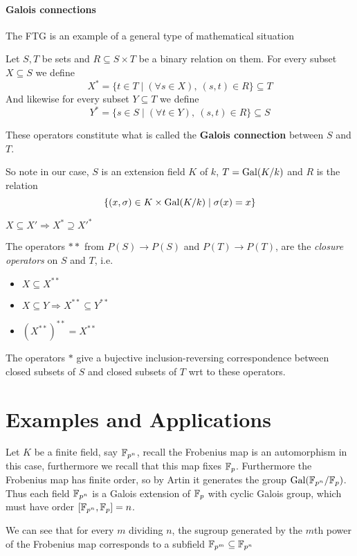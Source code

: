   \paragraph*{Galois connections}

  \begin{bergman}
    The FTG is an example of a general type of mathematical situation
    \begin{definition}
      Let $S,T$ be sets and $R\subseteq S\times T$ be a binary relation on them. For every subset $X\subseteq S$ we define \[
        X^\ast = \{t\in T\mid (\forall s\in X), \ (s,t)\in R\}\subseteq T  
      \]
      And likewise for every subset $Y\subseteq T$ we define\[
        Y^\ast = \{s\in S\mid (\forall t\in Y), \ (s,t)\in R\}\subseteq S  
      \] 

      These operators constitute what is called the \textbf{Galois connection} between $S$ and $T$.
    \end{definition}
    So note in our case, $S$ is an extension field $K$ of $k$, $T = \text{Gal}(K/k)$ and $R$ is the relation \[\{(x,\sigma)\in K\times \text{Gal}(K/k)\mid \sigma(x) = x \}\]
  
  \begin{Properties}
    \item $X\subseteq X' \Rightarrow X^\ast \supseteq X'^\ast$
    \item The operators $\ast\ast$ from $P(S)\rightarrow P(S)$ and  $P(T)\rightarrow P(T)$, are the \textit{closure operators} on $S$ and $T$, i.e.\begin{itemize}
  \item $X\subseteq X^{\ast\ast}$
  \item $X\subseteq Y\Rightarrow X^{\ast\ast}\subseteq Y^{\ast\ast}$
  \item ${(X^{\ast\ast})}^{\ast\ast} = X^{\ast\ast}$
\end{itemize}
    \item The operators $\ast$ give a bujective inclusion-reversing correspondence between closed subsets of $S$ and closed subsets of $T$ wrt to these operators.
  \end{Properties}
  \end{bergman}

  \section{Examples and Applications}
  \begin{bergman}
    Let $K$ be a finite field, say $\mathbb{F}_{p^n}$, recall the Frobenius map is an automorphism in this case, furthermore we recall that this map fixes $\mathbb{F}_p$. Furthermore the Frobenius map has finite order, so by Artin
    it generates the group $\text{Gal}(\mathbb{F}_{p^n}/\mathbb{F}_{p})$. Thus each field $\mathbb{F}_{p^n}$ is a Galois extension of $\mathbb{F}_{p}$ with cyclic Galois group, which must have order $[\mathbb{F}_{p^n}, \mathbb{F}_{p}] = n$.

    We can see that for every $m$ dividing $n$, the sugroup generated by the $m$th power of the Frobenius map corresponds to a subfield $\mathbb{F}_{p^m}\subseteq \mathbb{F}_{p^n}$ 
  \end{bergman}
  
